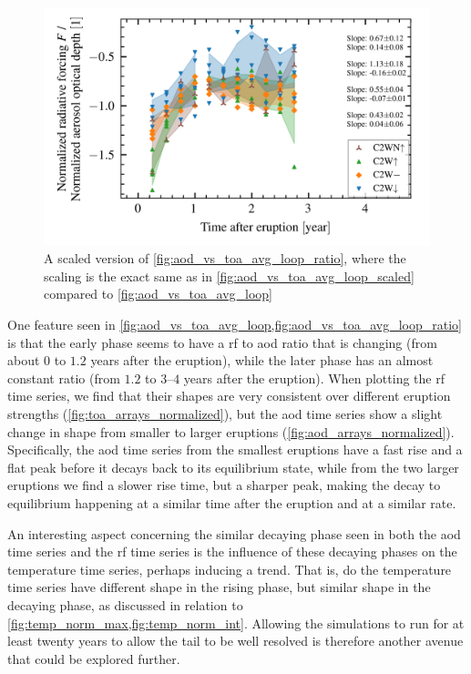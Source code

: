 \documentclass{ametsocV5}
\begin{document}
\begin{figure}[t]
  \begin{center}
    \includegraphics[width=0.95\linewidth]{figures/aod_vs_toa_avg_loop_ratio_scaled.png}
  \end{center}
  \caption{
    A scaled version of \cref{fig:aod_vs_toa_avg_loop_ratio}, where the scaling is the
    exact same as in \cref{fig:aod_vs_toa_avg_loop_scaled} compared to
    \cref{fig:aod_vs_toa_avg_loop}
  }%
  \label{fig:aod_vs_toa_avg_loop_ratio_scaled}
\end{figure}

One feature seen in \cref{fig:aod_vs_toa_avg_loop,fig:aod_vs_toa_avg_loop_ratio} is that
the early phase seems to have a \ac{rf} to \ac{aod} ratio that is changing (from about
\(0\) to \(1.2\) years after the eruption), while the later phase has an almost constant
ratio (from \(1.2\) to \(3\)--\(4\) years after the eruption). When plotting the \ac{rf}
time series, we find that their shapes are very consistent over different eruption
strengths (\cref{fig:toa_arrays_normalized}), but the \ac{aod} time series show a slight
change in shape from smaller to larger eruptions (\cref{fig:aod_arrays_normalized}).
Specifically, the \ac{aod} time series from the smallest eruptions have a fast rise and
a flat peak before it decays back to its equilibrium state, while from the two larger
eruptions we find a slower rise time, but a sharper peak, making the decay to
equilibrium happening at a similar time after the eruption and at a similar rate.

An interesting aspect concerning the similar decaying phase seen in both the \ac{aod}
time series and the \ac{rf} time series is the influence of these decaying phases on the
temperature time series, perhaps inducing a trend. That is, do the temperature time
series have different shape in the rising phase, but similar shape in the decaying
phase, as discussed in relation to \cref{fig:temp_norm_max,fig:temp_norm_int}. Allowing
the simulations to run for at least twenty years to allow the tail to be well resolved
is therefore another avenue that could be explored further.
\end{document}
